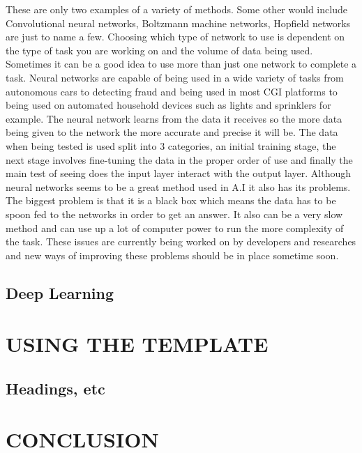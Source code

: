 \documentclass[letterpaper, 10 pt, conference]{ieeeconf}  %
\begin{document}
These are only two examples of a variety of methods. Some other would include Convolutional neural networks, Boltzmann machine networks, Hopfield networks are just to name a few. Choosing which type of network to use is dependent on the type of task you are working on and the volume of data being used. Sometimes it can be a good idea to use more than just one network to complete a task. 
Neural networks are capable of being used in a wide variety of tasks from autonomous cars to detecting fraud and being used in most CGI platforms to being used on automated household devices such as lights and sprinklers for example. The neural network learns from the data it receives so the more data being given to the network the more accurate and precise it will be. The data when being tested is used split into 3 categories, an initial training stage, the next stage involves fine-tuning the data in the proper order of use and finally the main test of seeing does the input layer interact with the output layer. Although neural networks seems to be a great method used in A.I it also has its problems. The biggest problem is that it is a black box which means the data has to be spoon fed to the networks in order to get an answer. It also can be a very slow method and can use up a lot of computer power to run the more complexity of the task. These issues are currently being worked on by developers and researches and new ways of improving these problems should be in place sometime soon. 

\subsection{Deep Learning}



\section{USING THE TEMPLATE}

\subsection{Headings, etc}

 
\section{CONCLUSION}
\end{document}
